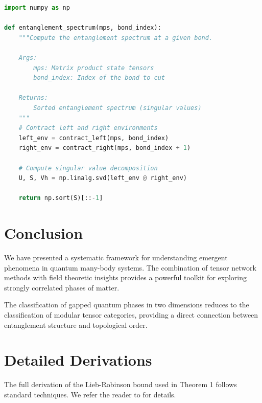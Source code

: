\documentclass[paper]{academic-report}
\begin{document}
\begin{lstlisting}[language=Python, caption={Computing entanglement spectrum from MPS}]
import numpy as np

def entanglement_spectrum(mps, bond_index):
    """Compute the entanglement spectrum at a given bond.

    Args:
        mps: Matrix product state tensors
        bond_index: Index of the bond to cut

    Returns:
        Sorted entanglement spectrum (singular values)
    """
    # Contract left and right environments
    left_env = contract_left(mps, bond_index)
    right_env = contract_right(mps, bond_index + 1)

    # Compute singular value decomposition
    U, S, Vh = np.linalg.svd(left_env @ right_env)

    return np.sort(S)[::-1]
\end{lstlisting}

\section{Conclusion}

We have presented a systematic framework for understanding emergent phenomena
in quantum many-body systems. The combination of tensor network methods with
field theoretic insights provides a powerful toolkit for exploring strongly
correlated phases of matter.

\begin{corollaryblock}[Classification]
The classification of gapped quantum phases in two dimensions reduces to the
classification of modular tensor categories, providing a direct connection
between entanglement structure and topological order.
\end{corollaryblock}

\appendix
\section{Detailed Derivations}

The full derivation of the Lieb-Robinson bound used in Theorem 1 follows
standard techniques. We refer the reader to \cite{bravyi2006} for details.

\printbibliography[title={References}]
\end{document}
